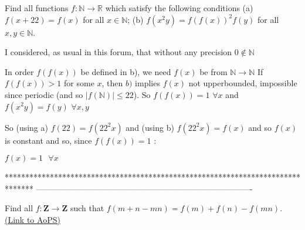 \begin{solution}
	\begin{tcolorbox}Find all functions $f:\mathbb{N}\rightarrow \mathbb{R}$ which satisfy the following conditions
(a) $f(x+22)=f(x)$ for all $x\in \mathbb{N}$;
(b) $f(x^2y)=f(f(x))^2 f(y)$ for all $x,y \in \mathbb{N}$.\end{tcolorbox}
I considered, as usual in this forum, that without any precision $0\notin\mathbb N$

In order $f(f(x))$ be defined in b), we need $f(x)$ be from $\mathbb N\to\mathbb N$
If $f(f(x))>1$ for some $x$, then $b)$ implies $f(x)$ not upperbounded, impossible since periodic (and so $|f(\mathbb N)|\le 22$). 
So $f(f(x))=1$ $\forall x$ and $f(x^2y)=f(y)$ $\forall x,y$

So (using a) $f(22)=f(22^2x)$ and (using b) $f(22^2x)=f(x)$ and so $f(x)$ is constant and so, since $f(f(x))=1$ :

$\boxed{f(x)=1\text{   }\forall x}$
\end{solution}
*******************************************************************************
-------------------------------------------------------------------------------

\begin{problem}
	Find all $f:\mathbf{Z} \rightarrow \mathbf{Z}$ such that
 $ f(m+n-mn)=f(m)+f(n)-f(mn).$
	\flushright \href{https://artofproblemsolving.com/community/c6h582533}{(Link to AoPS)}
\end{problem}



